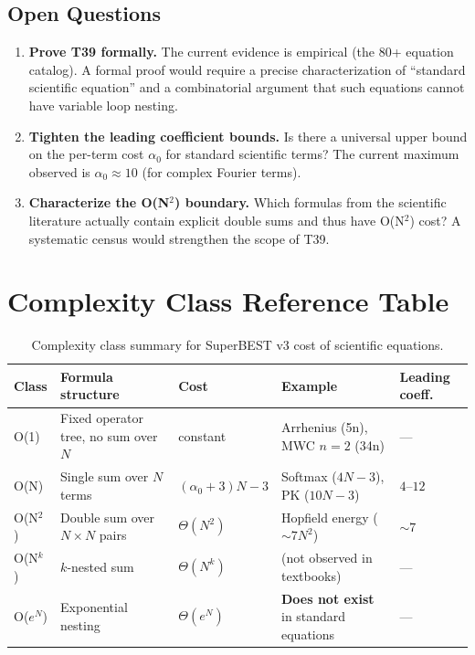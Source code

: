 \documentclass[12pt,a4paper]{article}
\theoremstyle{definition}
\begin{document}
\subsection{Open Questions}

\begin{enumerate}
  \item \textbf{Prove T39 formally.}  The current evidence is
        empirical (the 80+ equation catalog).  A formal proof would
        require a precise characterization of ``standard scientific
        equation'' and a combinatorial argument that such equations
        cannot have variable loop nesting.
  \item \textbf{Tighten the leading coefficient bounds.}  Is there
        a universal upper bound on the per-term cost $\alpha_0$ for
        standard scientific terms?  The current maximum observed is
        $\alpha_0 \approx 10$ (for complex Fourier terms).
  \item \textbf{Characterize the O(N$^2$) boundary.}  Which formulas
        from the scientific literature actually contain explicit double
        sums and thus have O(N$^2$) cost?  A systematic census would
        strengthen the scope of T39.
\end{enumerate}

\section{Complexity Class Reference Table}
\label{sec:reference}

\begin{table}[h]
\centering
\caption{Complexity class summary for SuperBEST v3 cost of scientific equations.}
\label{tab:classes}
\smallskip
\begin{tabular}{@{}lllll@{}}
\toprule
\textbf{Class} & \textbf{Formula structure} & \textbf{Cost}
               & \textbf{Example} & \textbf{Leading coeff.} \\
\midrule
O(1) & Fixed operator tree, no sum over $N$
     & constant
     & Arrhenius (5n), MWC $n=2$ (34n)
     & --- \\
O(N) & Single sum over $N$ terms
     & $(\alpha_0 + 3)N - 3$
     & Softmax ($4N-3$), PK ($10N-3$)
     & $4$--$12$ \\
O(N$^2$) & Double sum over $N\times N$ pairs
     & $\Theta(N^2)$
     & Hopfield energy ($\sim 7N^2$)
     & $\sim 7$ \\
O(N$^k$) & $k$-nested sum
     & $\Theta(N^k)$
     & (not observed in textbooks)
     & --- \\
O($e^N$) & Exponential nesting
     & $\Theta(e^N)$
     & \textbf{Does not exist} in standard equations
     & --- \\
\bottomrule
\end{tabular}
\end{table}
\end{document}
